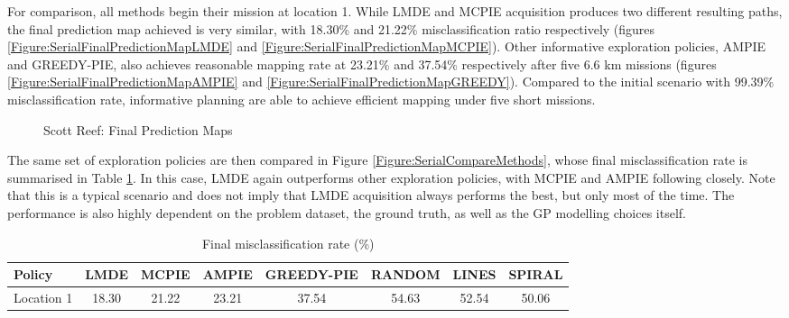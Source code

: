 			For comparison, all methods begin their mission at location 1. While LMDE and MCPIE acquisition produces two different resulting paths, the final prediction map achieved is very similar, with 18.30\% and 21.22\% misclassification ratio respectively (figures \ref{Figure:SerialFinalPredictionMapLMDE} and \ref{Figure:SerialFinalPredictionMapMCPIE}). Other informative exploration policies, AMPIE and GREEDY-PIE, also achieves reasonable mapping rate at 23.21\% and 37.54\% respectively after five 6.6 km missions (figures \ref{Figure:SerialFinalPredictionMapAMPIE} and \ref{Figure:SerialFinalPredictionMapGREEDY}). Compared to the initial scenario with 99.39\% misclassification rate, informative planning are able to achieve efficient mapping under five short missions.
			
			\begin{figure}[!htbp]
			\centering
			\caption{Scott Reef: Final Prediction Maps}
			\label{Figure:SerialFinalPredictionMap}
			\end{figure}
			
			The same set of exploration policies are then compared in Figure \ref{Figure:SerialCompareMethods}, whose final misclassification rate is summarised in Table \ref{Table:SerialCompareMethods}. In this case, LMDE again outperforms other exploration policies, with MCPIE and AMPIE following closely. Note that this is a typical scenario and does not imply that LMDE acquisition always performs the best, but only most of the time. The performance is also highly dependent on the problem dataset, the ground truth, as well as the GP modelling choices itself. 

			\begin{table}[t]
				{\footnotesize
				\begin{center}
					\begin{tabular}{ l c c c c c c c }
					\hline
					Policy & LMDE & MCPIE & AMPIE & GREEDY-PIE & RANDOM & LINES & SPIRAL \\
					\hline
					Location 1 & 18.30 & 21.22 & 23.21 & 37.54 & 54.63 & 52.54 & 50.06 \\
					\hline
					\end{tabular}
				\end{center}
				}
		  	\caption{Final misclassification rate (\%)}
		  	\label{Table:SerialCompareMethods}
		  	\end{table}	
		  				
